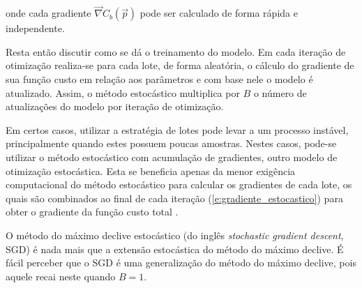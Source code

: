      \noindent onde cada gradiente $\vec{\nabla} C_b(\vec{p})$ pode ser calculado de forma rápida e independente.

      Resta então discutir como se dá o treinamento do modelo. Em cada iteração de otimização realiza-se para cada lote, de forma aleatória, o cálculo do gradiente de sua função custo em relação aos parâmetros e com base nele o modelo é atualizado. Assim, o método estocástico multiplica por $B$ o número de atualizações do modelo por iteração de otimização.

      Em certos casos, utilizar a estratégia de lotes pode levar a um processo instável, principalmente quando estes possuem poucas amostras. Nestes casos, pode-se utilizar o método estocástico com acumulação de gradientes, outro modelo de otimização estocástica. Esta se beneficia apenas da menor exigência computacional do método estocástico para calcular os gradientes de cada lote, os quais são combinados ao final de cada iteração (\ref{e:gradiente_estocastico}) para obter o gradiente da função custo total \DIFaddbegin {}\DIFaddend .

      O método do máximo declive estocástico (do inglês \textit{stochastic gradient descent}, SGD) é nada mais que a extensão estocástica do método do máximo declive. É fácil perceber que o SGD é uma generalização do método do máximo declive, pois aquele recai neste quando $B=1$.

